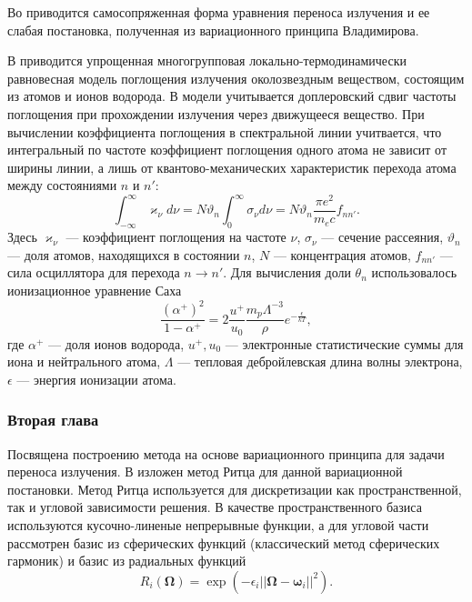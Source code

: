 Во  приводится самосопряженная форма уравнения переноса излучения и ее слабая постановка, полученная из вариационного принципа Владимирова. 

В  приводится упрощенная многогрупповая локально-термодинамически равновесная модель поглощения излучения околозвездным веществом, состоящим из атомов и ионов водорода. В модели учитывается доплеровский сдвиг частоты поглощения при прохождении излучения через движущееся вещество. При вычислении коэффициента поглощения в спектральной линии учитвается, что интегральный по частоте коэффициент поглощения одного атома не зависит от ширины линии, а лишь от квантово-механических характеристик перехода атома между состояниями $n$ и $n'$:
\[
\int_{-\infty}^\infty \varkappa_\nu d\nu = N \vartheta_n \int_0^\infty \sigma_\nu d\nu = N \vartheta_n \frac{\pi e^2}{m_e c} f_{nn'}.
\]
Здесь $\varkappa_\nu$ --- коэффициент поглощения на частоте $\nu$, $\sigma_\nu$ --- сечение рассеяния, $\vartheta_n$ --- доля атомов, находящихся в состоянии $n$, $N$ --- концентрация атомов, $f_{nn'}$ --- сила осциллятора для перехода $n \to n'$. Для вычисления доли $\theta_n$ использовалось ионизационное уравнение Саха
\[
\frac{(\alpha^+)^2}{1 - \alpha^+} = 2 \frac{u^+}{u_0} \frac{m_p \Lambda^{-3}}{\rho} e^{-\frac{\epsilon}{kT}},
\]
где $\alpha^+$ --- доля ионов водорода, $u^+, u_0$ --- электронные статистические суммы для иона и нейтрального атома, $\Lambda$ --- тепловая дебройлевская длина волны электрона, $\epsilon$ --- энергия ионизации атома.


\subsubsection*{Вторая глава}
Посвящена построению метода на основе вариационного принципа для задачи переноса излучения. В  изложен метод Ритца для данной вариационной постановки. Метод Ритца используется для дискретизации как пространственной, так и угловой зависимости решения. В качестве пространственного базиса используются кусочно-линеные непрерывные функции, а для угловой части рассмотрен базис из сферических функций (классический метод сферических гармоник) и базис из радиальных функций
\[
R_i(\boldsymbol \Omega) = \exp (-\epsilon_i ||\boldsymbol \Omega - \boldsymbol \omega_i||^2).
\] 

